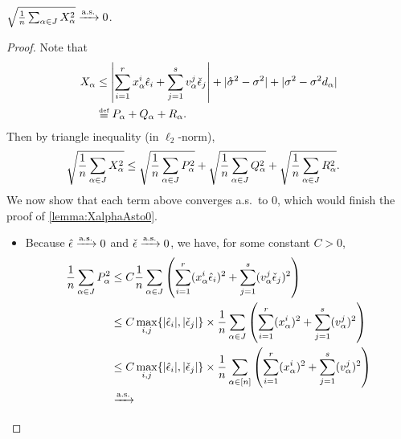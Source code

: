 \documentclass[main.tex]{subfiles}
\begin{document}
\begin{lemma}\label{lemma:XalphaAsto0}
$\sqrt{\frac{1}{n} \sum_{\alpha \in J} X_\alpha^2} \xrightarrow{\mathrm{a.s.}} 0$.
\end{lemma}
\begin{proof}
    Note that
    \begin{align*}
    X_\alpha
        &\le
            \left|\sum_{i=1}^r \xme_\alpha^i \hat \epsilon_i
                    + \sum_{j=1}^s \vme_\alpha^j \check \epsilon_j
            \right|
            + |\mathring \sigma^2 - \sigma^2|
            + |\sigma^2 - \sigma^2 d_\alpha|
            \\
        &\defeq
            P_\alpha + Q_\alpha + R_\alpha
            .
    \end{align*}
    Then by triangle inequality (in $\ell_2$-norm),
    \begin{align*}
    \sqrt{\frac{1}{n} \sum_{\alpha \in J} X_\alpha^2}
        &\le
            \sqrt{\frac{1}{n} \sum_{\alpha \in J} P_\alpha^2}
            + \sqrt{\frac{1}{n} \sum_{\alpha \in J} Q_\alpha^2}
            + \sqrt{\frac{1}{n} \sum_{\alpha \in J} R_\alpha^2}
            .
    \end{align*}
    We now show that each term above converges a.s.\ to 0, which would finish the proof of \cref{lemma:XalphaAsto0}.
    \begin{itemize}
    \item
        Because $\hat \epsilon \xrightarrow{\mathrm{a.s.}} 0$ and $\check \epsilon \xrightarrow{\mathrm{a.s.}} 0$, we have, for some constant $C > 0$,
        \begin{align*}
        \f 1 n \sum_{\alpha \in \JJc} P_\alpha^2
            &\le
                C \f 1 n \sum_{\alpha \in \JJc} \lp
                    \sum_{i=1}^r (\xme_\alpha^i \hat \epsilon_i)^2
                    + \sum_{j=1}^s (\vme_\alpha^j \check \epsilon_j)^2
                    \rp
                \\
            &\le
                C \max_{i,j}\{|\hat \epsilon_i|, |\check \epsilon_j|\} \times 
                \f 1 n \sum_{\alpha \in \JJc} \lp
                    \sum_{i=1}^r (\xme_\alpha^i)^2
                    + \sum_{j=1}^s (\vme_\alpha^j)^2
                    \rp
                \\
            &\le
                C \max_{i,j}\{|\hat \epsilon_i|, |\check \epsilon_j|\} \times 
                \f 1 n \sum_{\alpha \in [n]} \lp
                    \sum_{i=1}^r (\xme_\alpha^i)^2
                    + \sum_{j=1}^s (\vme_\alpha^j)^2
                    \rp
                \\
            &\asto

\end{align*}
\end{itemize}
\end{proof}
\end{document}
